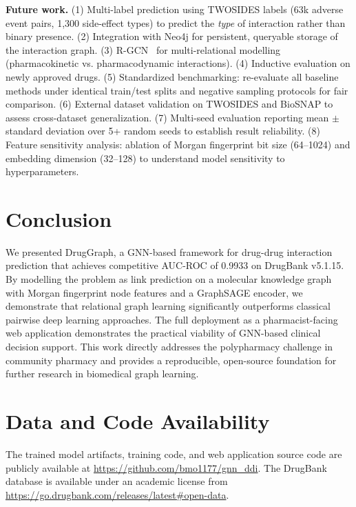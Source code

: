 \documentclass[10pt,twocolumn]{article}
\begin{document}
\textbf{Future work.} (1) Multi-label prediction using TWOSIDES labels (63k
adverse event pairs, 1,300 side-effect types) to predict the \textit{type} of
interaction rather than binary presence. (2) Integration with Neo4j for
persistent, queryable storage of the interaction graph. (3) R-GCN~\cite{wu2021}
for multi-relational modelling (pharmacokinetic vs. pharmacodynamic
interactions). (4) Inductive evaluation on newly approved drugs. (5) Standardized
benchmarking: re-evaluate all baseline methods under identical train/test splits
and negative sampling protocols for fair comparison. (6) External dataset
validation on TWOSIDES and BioSNAP to assess cross-dataset generalization.
(7) Multi-seed evaluation reporting mean $\pm$ standard deviation over 5+
random seeds to establish result reliability. (8) Feature sensitivity analysis:
ablation of Morgan fingerprint bit size (64--1024) and embedding dimension
(32--128) to understand model sensitivity to hyperparameters.

\section{Conclusion}

We presented DrugGraph, a GNN-based framework for drug-drug interaction prediction
that achieves competitive AUC-ROC of 0.9933 on DrugBank v5.1.15. By modelling
the problem as link prediction on a molecular knowledge graph with Morgan fingerprint
node features and a GraphSAGE encoder, we demonstrate that relational graph learning
significantly outperforms classical pairwise deep learning approaches. The full
deployment as a pharmacist-facing web application demonstrates the practical viability
of GNN-based clinical decision support. This work directly addresses the polypharmacy
challenge in community pharmacy and provides a reproducible, open-source foundation
for further research in biomedical graph learning.

\section*{Data and Code Availability}
The trained model artifacts, training code, and web application source code are
publicly available at \url{https://github.com/bmo1177/gnn_ddi}. The DrugBank
database is available under an academic license from
\url{https://go.drugbank.com/releases/latest#open-data}.
\end{document}

